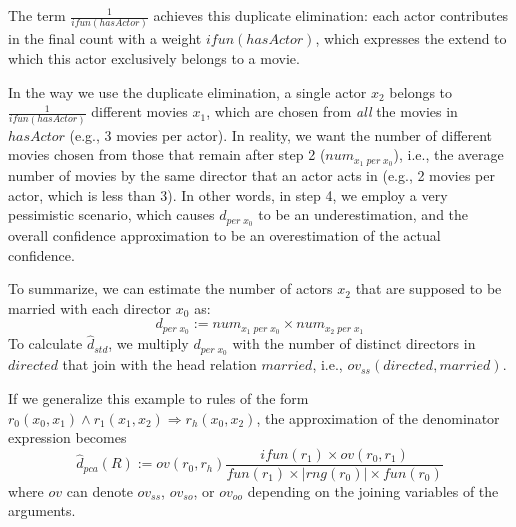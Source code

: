 {The term $\frac{1}{ifun(hasActor)}$ achieves this duplicate elimination: each actor contributes in the final count with a weight $ifun(hasActor)$, which expresses the extend to which this actor exclusively belongs to a movie.

In the way we use the duplicate elimination, a single actor $x_2$ belongs to $\frac{1}{ifun(hasActor)}$ different movies $x_1$, which are chosen from \emph{all} the movies in  $hasActor$ (e.g., 3 movies per actor).
In reality, we want the number of different movies chosen from those that remain after step 2 ($num_{x_1\; per \; x_0}$), %
i.e., the average number of movies by the same director that an actor acts in (e.g., 2 movies per actor, which is less than 3). %
In other words, in step 4, we employ a very pessimistic scenario, which causes $d_{per\; x_0}$ to be an underestimation, and the overall confidence approximation to be an overestimation of the actual confidence.

To summarize, we can estimate the number of actors $x_2$ that are supposed to be married with each director $x_0$ as:
$$
 d_{per\; x_0} :=  num_{x_1 \; per \; x_0} \times num_{x_2 \; per \; x_1}
$$
\noindent To calculate $\widehat{d}_{std}$, we multiply $d_{per\; x_0}$ with the number of distinct directors in $directed$ that join with the head relation $married$, i.e., $ov_{ss}(directed, married)$.

If we generalize this example to rules of the form $r_0(x_0,x_1) \wedge r_1(x_1,x_2) \Rightarrow r_h(x_0,x_2)$, the approximation of the denominator expression becomes
\[
  \widehat{d}_{pca}(R) := ov(r_0, r_h)\frac{ifun(r_1) \times ov(r_0,r_1)}{fun(r_1) \times |rng(r_0)| \times fun(r_0)}
\]
\noindent where $ov$ can denote $ov_{ss}$, $ov_{so}$, or $ov_{oo}$ depending on the joining variables of the arguments.

}
